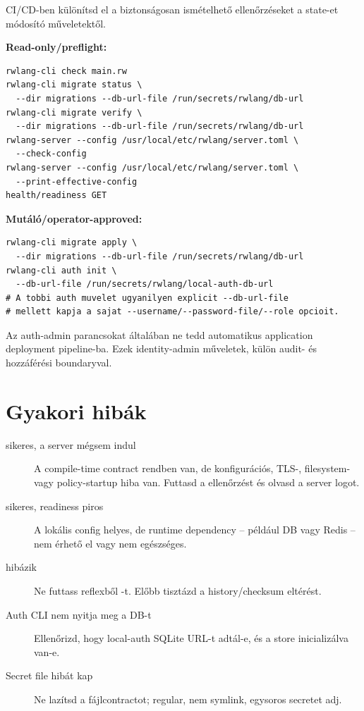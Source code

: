 CI/CD-ben különítsd el a biztonságosan ismételhető ellenőrzéseket a state-et módosító műveletektől.

\textbf{Read-only/preflight:}

\begin{lstlisting}
rwlang-cli check main.rw
rwlang-cli migrate status \
  --dir migrations --db-url-file /run/secrets/rwlang/db-url
rwlang-cli migrate verify \
  --dir migrations --db-url-file /run/secrets/rwlang/db-url
rwlang-server --config /usr/local/etc/rwlang/server.toml \
  --check-config
rwlang-server --config /usr/local/etc/rwlang/server.toml \
  --print-effective-config
health/readiness GET
\end{lstlisting}

\textbf{Mutáló/operator-approved:}

\begin{lstlisting}
rwlang-cli migrate apply \
  --dir migrations --db-url-file /run/secrets/rwlang/db-url
rwlang-cli auth init \
  --db-url-file /run/secrets/rwlang/local-auth-db-url
# A tobbi auth muvelet ugyanilyen explicit --db-url-file
# mellett kapja a sajat --username/--password-file/--role opcioit.
\end{lstlisting}

Az auth-admin parancsokat általában ne tedd automatikus application deployment pipeline-ba. Ezek identity-admin műveletek, külön audit- és hozzáférési boundaryval.

\section{Gyakori hibák}

\begin{description}
  \item[ sikeres, a server mégsem indul] A compile-time contract rendben van, de konfigurációs, TLS-, filesystem- vagy policy-startup hiba van. Futtasd a  ellenőrzést és olvasd a server logot.
  \item[\code{--check-config} sikeres, readiness piros] A lokális config helyes, de runtime dependency -- például DB vagy Redis -- nem érhető el vagy nem egészséges.
  \item[ hibázik] Ne futtass reflexből -t. Előbb tisztázd a history/checksum eltérést.
  \item[Auth CLI nem nyitja meg a DB-t] Ellenőrizd, hogy local-auth SQLite URL-t adtál-e, és a store inicializálva van-e.
  \item[Secret file hibát kap] Ne lazítsd a fájlcontractot; regular, nem symlink, egysoros secretet adj.
\end{description}

